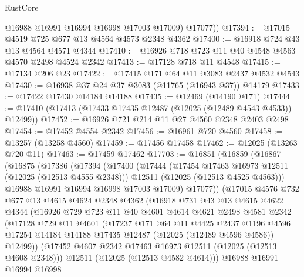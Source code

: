 \begin{lexlean}{RustCore}
\begin{coremodule}
          @16988
          @16991
          @16994
          @16998
          @17003
          @17009)
        @17077))
@17394 := @17015 @4519 @725 @677 @13 @4564 @4573 @2348 @4362
@17400 := @16918 @724 @43 @13 @4564 @4571 @4344
@17410 := @16926 @718 @723 @11 @40 @4548 @4563 @4570 @2498 @4524 @2342
@17413 := @17128 @718 @11 @4548
@17415 := @17134 @206 @23
@17422 := @17415 @171 @64 @11 @3083 @2437 @4532 @4543
@17430 := @16938 @37 @24 @37 @3083 (@11765 (@16943 @37)) @14179
@17433 := @17422 @17430 @14184 @14188
@17435 := @12469 (@14190 @171)
@17444 := @17410 (@17413 (@17433 @17435 @12487 (@12025 (@12489 @4543 @4533)) @12499))
@17452 := @16926 @721 @214 @11 @27 @4560 @2348 @2403 @2498
@17454 := @17452 @4554 @2342
@17456 := @16961 @720 @4560
@17458 := @13257 (@13258 @4560)
@17459 := @17456 @17458
@17462 := @12025 (@13263 @720 @11)
@17463 := @17459 @17462
@17703 := @16851
    (@16859
      (@16867
        (@16875
          (@17386
            (@17394
              (@17400
                (@17444
                  (@17454 @17463 @16973 @12511 (@12025 (@12513 @4555 @2348)))
                  @12511
                  (@12025 (@12513 @4525 @4563)))
                @16988
                @16991
                @16994
                @16998
                @17003
                @17009)
              @17077))
          (@17015
            @4576
            @732
            @677
            @13
            @4615
            @4624
            @2348
            @4362
            (@16918
              @731
              @43
              @13
              @4615
              @4622
              @4344
              (@16926
                @729
                @723
                @11
                @40
                @4601
                @4614
                @4621
                @2498
                @4581
                @2342
                (@17128
                  @729
                  @11
                  @4601
                  (@17237
                    @171
                    @64
                    @11
                    @4425
                    @2437
                    @1196
                    @4596
                    @17254
                    @14184
                    @14188
                    @17435
                    @12487
                    (@12025 (@12489 @4596 @4586))
                    @12499))
                (@17452 @4607 @2342 @17463 @16973 @12511 (@12025 (@12513 @4608 @2348)))
                @12511
                (@12025 (@12513 @4582 @4614)))
              @16988
              @16991
              @16994
              @16998

\end{coremodule}
\end{lexlean}
